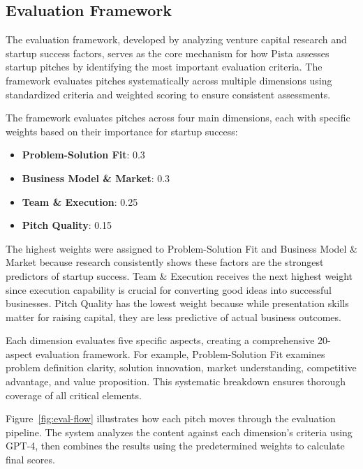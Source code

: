 \subsection{Evaluation Framework}\label{subsec:evaluation-framework}

The evaluation framework, developed by analyzing venture capital research and startup success factors, serves as the core mechanism for how Pista assesses startup pitches by identifying the most important evaluation criteria. The framework evaluates pitches systematically across multiple dimensions using standardized criteria and weighted scoring to ensure consistent assessments.

The framework evaluates pitches across four main dimensions, each with specific weights based on their importance for startup success:

\begin{itemize}
  \item \textbf{Problem\mbox{-}Solution Fit}: 0.3
  \item \textbf{Business Model \& Market}: 0.3
  \item \textbf{Team \& Execution}: 0.25
  \item \textbf{Pitch Quality}: 0.15
\end{itemize}

The highest weights were assigned to Problem-Solution Fit and Business Model \& Market because research consistently shows these factors are the strongest predictors of startup success. Team \& Execution receives the next highest weight since execution capability is crucial for converting good ideas into successful businesses. Pitch Quality has the lowest weight because while presentation skills matter for raising capital, they are less predictive of actual business outcomes.

Each dimension evaluates five specific aspects, creating a comprehensive 20-aspect evaluation framework. For example, Problem-Solution Fit examines problem definition clarity, solution innovation, market understanding, competitive advantage, and value proposition. This systematic breakdown ensures thorough coverage of all critical elements.

Figure~\ref{fig:eval-flow} illustrates how each pitch moves through the evaluation pipeline. The system analyzes the content against each dimension's criteria using GPT-4, then combines the results using the predetermined weights to calculate final scores.

